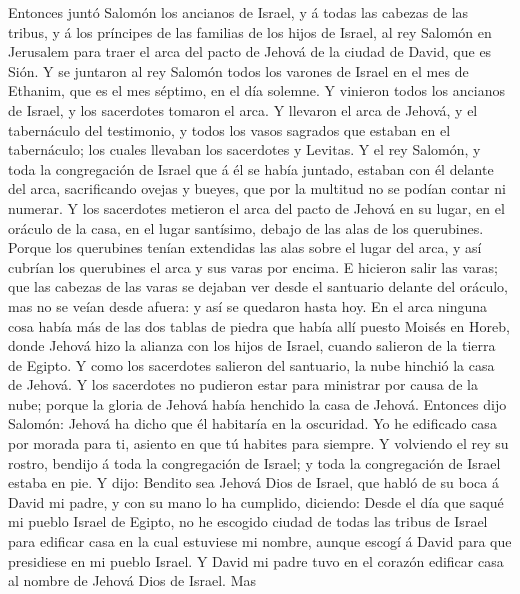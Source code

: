  Entonces juntó Salomón los ancianos de Israel, y á todas
las cabezas de las tribus, y á los príncipes de las familias de los
hijos de Israel, al rey Salomón en Jerusalem para traer el arca del
pacto de Jehová de la ciudad de David, que es Sión.  Y se
juntaron al rey Salomón todos los varones de Israel en el mes de
Ethanim, que es el mes séptimo, en el día solemne.  Y
vinieron todos los ancianos de Israel, y los sacerdotes tomaron el arca.
 Y llevaron el arca de Jehová, y el tabernáculo del
testimonio, y todos los vasos sagrados que estaban en el tabernáculo;
los cuales llevaban los sacerdotes y Levitas.  Y el rey
Salomón, y toda la congregación de Israel que á él se había juntado,
estaban con él delante del arca, sacrificando ovejas y bueyes, que por
la multitud no se podían contar ni numerar.  Y los
sacerdotes metieron el arca del pacto de Jehová en su lugar, en el
oráculo de la casa, en el lugar santísimo, debajo de las alas de los
querubines.  Porque los querubines tenían extendidas las
alas sobre el lugar del arca, y así cubrían los querubines el arca y sus
varas por encima.  E hicieron salir las varas; que las
cabezas de las varas se dejaban ver desde el santuario delante del
oráculo, mas no se veían desde afuera: y así se quedaron hasta hoy.
 En el arca ninguna cosa había más de las dos tablas de
piedra que había allí puesto Moisés en Horeb, donde Jehová hizo la
alianza con los hijos de Israel, cuando salieron de la tierra de Egipto.
 Y como los sacerdotes salieron del santuario, la nube
hinchió la casa de Jehová.  Y los sacerdotes no pudieron
estar para ministrar por causa de la nube; porque la gloria de Jehová
había henchido la casa de Jehová.  Entonces dijo Salomón:
Jehová ha dicho que él habitaría en la oscuridad.  Yo he
edificado casa por morada para ti, asiento en que tú habites para
siempre.  Y volviendo el rey su rostro, bendijo á toda la
congregación de Israel; y toda la congregación de Israel estaba en pie.
 Y dijo: Bendito sea Jehová Dios de Israel, que habló de
su boca á David mi padre, y con su mano lo ha cumplido, diciendo:
 Desde el día que saqué mi pueblo Israel de Egipto, no he
escogido ciudad de todas las tribus de Israel para edificar casa en la
cual estuviese mi nombre, aunque escogí á David para que presidiese en
mi pueblo Israel.  Y David mi padre tuvo en el corazón
edificar casa al nombre de Jehová Dios de Israel.  Mas
